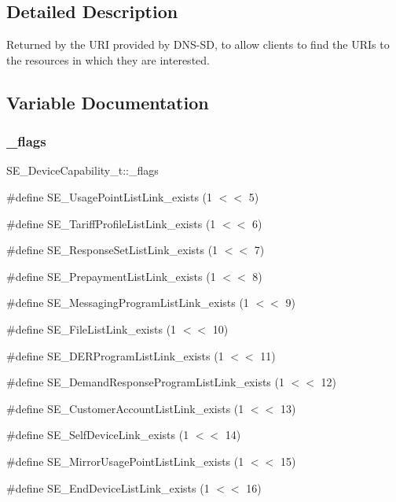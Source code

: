 \subsection{Detailed Description}
Returned by the U\+RI provided by D\+N\+S-\/\+SD, to allow clients to find the U\+R\+Is to the resources in which they are interested. 

\subsection{Variable Documentation}
\mbox{\label{group__DeviceCapability_ga98256bcf33639c1d6e735d1079fd2069}} 
\subsubsection{\texorpdfstring{\+\_\+flags}{\_flags}}
{\footnotesize\ttfamily S\+E\+\_\+\+Device\+Capability\+\_\+t\+::\+\_\+flags}

\#define S\+E\+\_\+\+Usage\+Point\+List\+Link\+\_\+exists (1 $<$$<$ 5)

\#define S\+E\+\_\+\+Tariff\+Profile\+List\+Link\+\_\+exists (1 $<$$<$ 6)

\#define S\+E\+\_\+\+Response\+Set\+List\+Link\+\_\+exists (1 $<$$<$ 7)

\#define S\+E\+\_\+\+Prepayment\+List\+Link\+\_\+exists (1 $<$$<$ 8)

\#define S\+E\+\_\+\+Messaging\+Program\+List\+Link\+\_\+exists (1 $<$$<$ 9)

\#define S\+E\+\_\+\+File\+List\+Link\+\_\+exists (1 $<$$<$ 10)

\#define S\+E\+\_\+\+D\+E\+R\+Program\+List\+Link\+\_\+exists (1 $<$$<$ 11)

\#define S\+E\+\_\+\+Demand\+Response\+Program\+List\+Link\+\_\+exists (1 $<$$<$ 12)

\#define S\+E\+\_\+\+Customer\+Account\+List\+Link\+\_\+exists (1 $<$$<$ 13)

\#define S\+E\+\_\+\+Self\+Device\+Link\+\_\+exists (1 $<$$<$ 14)

\#define S\+E\+\_\+\+Mirror\+Usage\+Point\+List\+Link\+\_\+exists (1 $<$$<$ 15)

\#define S\+E\+\_\+\+End\+Device\+List\+Link\+\_\+exists (1 $<$$<$ 16) \mbox{\label{group__DeviceCapability_ga67440b38a37d6f2b067aa93494458133}} 
